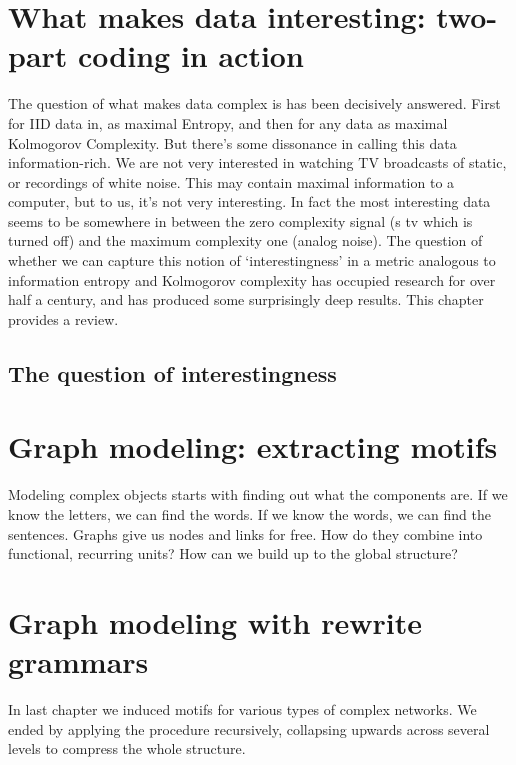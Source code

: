 \documentclass{thesis}
\begin{document}
\chapter{What makes data interesting: two-part coding in action}

\begin{summary}The question of what makes data complex is has been decisively answered. First for IID data in, as maximal Entropy, and then for any data as maximal Kolmogorov Complexity. But there's some dissonance in calling this data information-rich. We are not very interested in watching TV broadcasts of static, or recordings of white noise. This may contain maximal information to a computer, but to us, it's not very interesting. In fact the most interesting data seems to be somewhere in between the zero complexity signal (s tv which is turned off) and the maximum complexity one (analog noise). The question of whether we can capture this notion of `interestingness' in a metric analogous to information entropy and Kolmogorov complexity has occupied research for over half a century, and has produced some surprisingly deep results. This chapter provides a review.
\end{summary}

\section{The question of interestingness}

\chapter{Graph modeling: extracting motifs}

\begin{summary}Modeling complex objects starts with finding out what the components are. If we know the letters, we can find the words. If we know the words, we can find the sentences. Graphs give us nodes and links for free. How do they combine into functional, recurring units? How can we build up to the global structure?
\end{summary}

\chapter{Graph modeling with rewrite grammars}

\begin{summary}In last chapter we induced motifs for various types of complex networks. We ended by applying the procedure recursively, collapsing upwards across several levels to compress the whole structure.
\end{summary}
\end{document}
